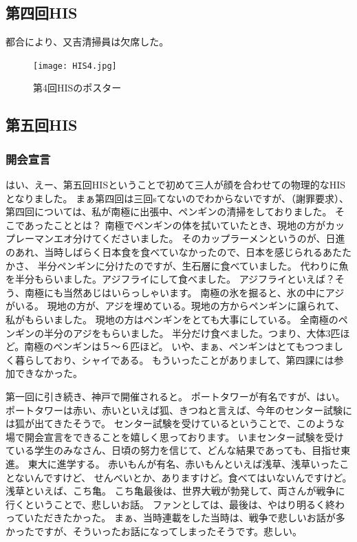 \subsection{第四回HIS}
都合により、又吉清掃員は欠席した。

\begin{figure}[H]
\centering
\texttt{[image: HIS4.jpg]}
\caption{第4回HISのポスター}
\label{HIS3}
\end{figure}


\subsection{第五回HIS}
\subsubsection{開会宣言}
はい、えー、第五回HISということで初めて三人が顔を合わせての物理的なHISとなりました。
まぁ第四回は三回sてないのでわからないですが、（謝罪要求）、第四回については、私が南極に出張中、ペンギンの清掃をしておりました。
そこであったこととは？
南極でペンギンの体を拭いていたとき、現地の方がカップレーマンエオ分けてくださいました。
そのカップラーメンというのが、日進のあれ、当時しばらく日本食を食べていなかったので、日本を感じられるあたたかさ、
半分ペンギンに分けたのですが、生石層に食べていました。
代わりに魚を半分もらいました。アジフライにして食べました。
アジフライといえば？そう、南極にも当然あじはいらっしゃいます。
南極の氷を掘ると、氷の中にアジがいる。
現地の方が、アジを埋めている。現地の方からペンギンに譲られて、私がもらいました。
現地の方はペンギンをとても大事にしている。
全南極のペンギンの半分のアジをもらいました。
半分だけ食べました。つまり、大体3匹ほど。南極のペンギンは５〜６匹ほど。
いや、まぁ、ペンギンはとてもつつましく暮らしており、シャイである。
もういったことがありまして、第四課には参加できなかった。

第一回に引き続き、神戸で開催されると。
ポートタワーが有名ですが、はい。
ポートタワーは赤い、赤いといえば狐、きつねと言えば、今年のセンター試験には狐が出てきたそうで。
センター試験を受けているということで、このような場で開会宣言をできることを嬉しく思っております。
いまセンター試験を受けている学生のみなさん、日頃の努力を信じて、どんな結果であっても、目指せ東進。
東大に進学する。
赤いもんが有名、赤いもんといえば浅草、浅草いったことないんですけど、
せんべいとか、ありますけど。食べてはいないんですけど。
浅草といえば、こち亀。
こち亀最後は、世界大戦が勃発して、両さんが戦争に行くということで、悲しいお話。
ファンとしては、最後は、やはり明るく終わっていただきたかった。
まぁ、当時連載をした当時は、戦争で悲しいお話が多かったですが、そういったお話になってしまったそうです。悲しい。

